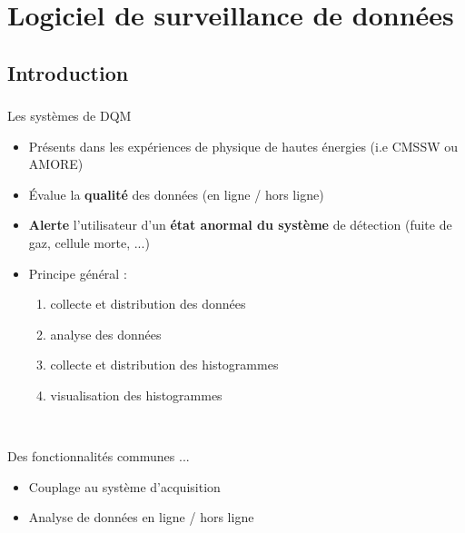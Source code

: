 \documentclass[8pt]{beamer}
\begin{document}
    \section{Logiciel de surveillance de données}

    \begin{frame}
    \frametitle{\secname}
      \tableofcontents[currentsection]
    \end{frame}

    \subsection{Introduction}

    \begin{frame}
    \frametitle{\secname}
    \framesubtitle{\subsecname}
    \small
      \begin{block}{Les systèmes de DQM}
        \begin{itemize}
          \item Présents dans les expériences de physique de hautes énergies (i.e CMSSW ou AMORE)
          \item Évalue la \textbf{qualité} des données (en ligne / hors ligne)
          \item \textbf{Alerte} l'utilisateur d'un \textbf{état anormal du système} de détection (fuite de gaz, cellule morte, ...)
          \item Principe général :
          \begin{enumerate}
            \item collecte et distribution des données
            \item analyse des données
            \item collecte et distribution des histogrammes
            \item visualisation des histogrammes
          \end{enumerate}
        \end{itemize}
      \end{block}
      \pause
      ~ \\
      \begin{minipage}{0.47\linewidth}
        \begin{block}{Des fonctionnalités communes ...}
          \begin{itemize}
            \item Couplage au système d'acquisition
            \item Analyse de données en ligne / hors ligne

\end{itemize}
\end{block}
\end{minipage}
\end{frame}
\end{document}

